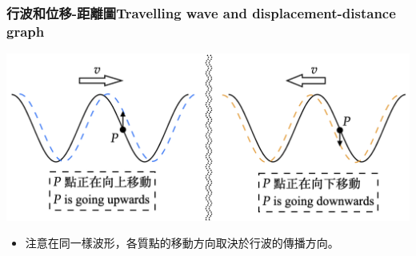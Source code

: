 \documentclass[beamer=true]{standalone}
\begin{document}
\begin{frame}
    \frametitle{行波和位移-距離圖Travelling wave and displacement-distance graph}
    \par{\par\centering\includegraphics[width=\textwidth]{./img/ch1_2024-05-09-14-58-40.png}\par}
    \begin{itemize}
        \item 注意在同一樣波形，各質點的移動方向取決於行波的傳播方向。
    \end{itemize}
\end{frame}
\end{document}
